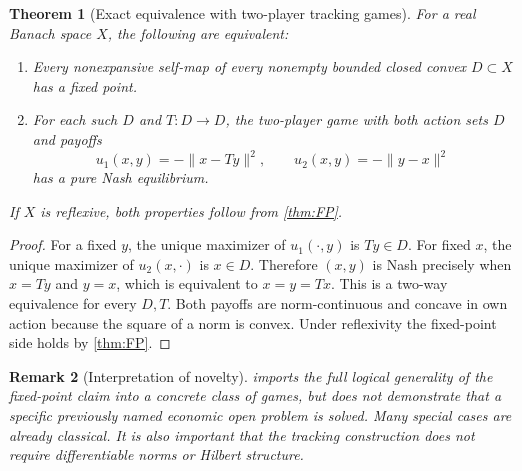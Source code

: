 \documentclass[11pt]{article}
\newtheorem{theorem}{Theorem}[section]
\newtheorem{remark}[theorem]{Remark}
\theoremstyle{definition}\newtheorem{definition}[theorem]{Definition}
\begin{document}
\begin{theorem}[Exact equivalence with two-player tracking games\label{thm:equivalence}]
For a real Banach space $X$, the following are equivalent:
\begin{enumerate}[label=(\roman*)]
\item Every nonexpansive self-map of every nonempty bounded closed convex $D\subset X$ has a fixed point.
\item For each such $D$ and $T:D\to D$, the two-player game with both action sets $D$ and payoffs
\[u_1(x,y)=-\|x-Ty\|^2,\qquad u_2(x,y)=-\|y-x\|^2\]
has a pure Nash equilibrium.
\end{enumerate}
If $X$ is reflexive, both properties follow from \cref{thm:FP}.
\end{theorem}
\begin{proof}
For a fixed $y$, the unique maximizer of $u_1(\cdot,y)$ is $Ty\in D$. For fixed $x$, the unique maximizer of $u_2(x,\cdot)$ is $x\in D$. Therefore $(x,y)$ is Nash precisely when $x=Ty$ and $y=x$, which is equivalent to $x=y=Tx$. This is a two-way equivalence for every $D,T$. Both payoffs are norm-continuous and concave in own action because the square of a norm is convex. Under reflexivity the fixed-point side holds by \cref{thm:FP}.
\end{proof}
\begin{remark}[Interpretation of novelty]
 imports the full logical generality of the fixed-point claim into a concrete class of games, but does not demonstrate that a specific previously named economic open problem is solved. Many special cases are already classical. It is also important that the tracking construction does not require differentiable norms or Hilbert structure.
\end{remark}
\end{document}

